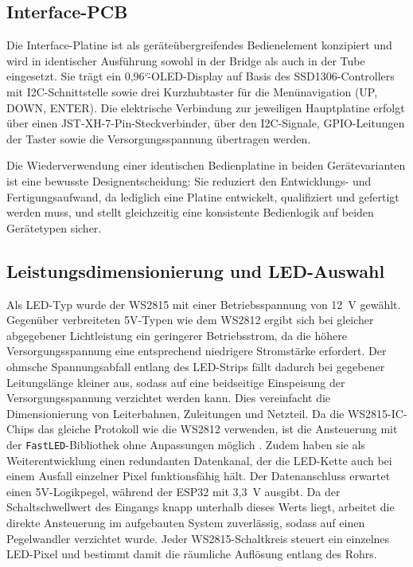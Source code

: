 \subsection{Interface-PCB}
\label{subsec:interface-pcb}

Die Interface-Platine ist als geräteübergreifendes
Bedienelement konzipiert und wird in identischer Ausführung
sowohl in der Bridge als auch in der Tube eingesetzt. Sie
trägt ein 0,96\char`\"-OLED-Display auf Basis des
SSD1306-Controllers mit I2C-Schnittstelle sowie drei
Kurzhubtaster für die Menünavigation (UP, DOWN, ENTER). Die
elektrische Verbindung zur jeweiligen Hauptplatine erfolgt
über einen JST-XH-7-Pin-Steckverbinder, über den I2C-Signale,
GPIO-Leitungen der Taster sowie die Versorgungsspannung
übertragen werden.

Die Wiederverwendung einer identischen Bedienplatine in beiden
Gerätevarianten ist eine bewusste Designentscheidung: Sie
reduziert den Entwicklungs- und Fertigungsaufwand, da
lediglich eine Platine entwickelt, qualifiziert und gefertigt
werden muss, und stellt gleichzeitig eine konsistente
Bedienlogik auf beiden Gerätetypen sicher.

\subsection{Leistungsdimensionierung und LED-Auswahl}
\label{subsec:leistung-led}

Als LED-Typ wurde der WS2815 mit einer Betriebsspannung von
12~V gewählt. Gegenüber verbreiteten 5V-Typen wie dem WS2812
ergibt sich bei gleicher abgegebener Lichtleistung ein
geringerer Betriebsstrom, da die höhere Versorgungsspannung
eine entsprechend niedrigere Stromstärke erfordert. Der
ohmsche Spannungsabfall entlang des LED-Strips fällt dadurch
bei gegebener Leitungslänge kleiner aus, sodass auf eine
beidseitige Einspeisung der Versorgungsspannung
verzichtet werden kann. Dies vereinfacht die
Dimensionierung von Leiterbahnen, Zuleitungen und Netzteil.
Da die WS2815-IC-Chips das gleiche Protokoll wie die WS2812 verwenden, ist die
Ansteuerung mit der \texttt{FastLED}-Bibliothek ohne Anpassungen
möglich \cite{ws2815_datasheet}. 
Zudem haben sie als Weiterentwicklung einen redundanten Datenkanal,
der die LED-Kette auch bei einem Ausfall einzelner Pixel funktionsfähig
hält. Der Datenanschluss erwartet einen 5V-Logikpegel, während der
ESP32 mit 3,3~V ausgibt. Da der Schaltschwellwert des Eingangs knapp
unterhalb dieses Werts liegt, arbeitet die direkte Ansteuerung im
aufgebauten System zuverlässig, sodass auf einen Pegelwandler verzichtet
wurde.
Jeder WS2815-Schaltkreis steuert ein einzelnes LED-Pixel und
bestimmt damit die räumliche Auflösung entlang des Rohrs.

